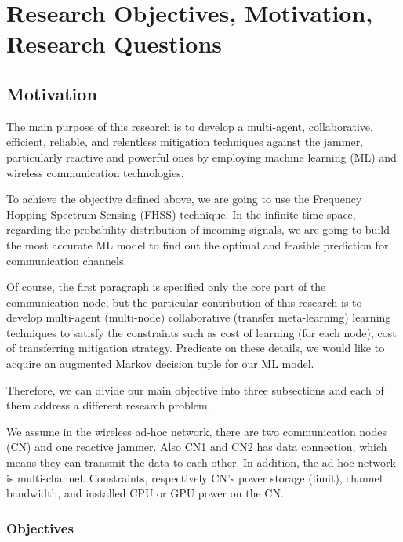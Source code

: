 \documentclass[letterpaper%
, oneside%
, 12pt%
,thesepararticles%
, english%
,creativecommons,hyperref, withAlgo2e%
]{thETS}
\begin{document}


\chapter{Research Objectives, Motivation, Research Questions}

\section{Motivation}

The main purpose of this research is to develop a multi-agent, collaborative, efficient, reliable, and relentless mitigation techniques against the jammer, particularly reactive and powerful ones by employing machine learning (ML) and wireless communication technologies. 

To achieve the objective defined above, we are going to use the Frequency Hopping Spectrum  Sensing (FHSS) technique. In the infinite time space, regarding the probability distribution of incoming signals, we are going to build the most accurate ML model to find out  the optimal and feasible prediction for communication channels.

Of course, the first paragraph is specified only the core part of the communication node, but the particular contribution of this research is to develop multi-agent (multi-node) collaborative (transfer meta-learning) learning techniques to satisfy the constraints such as cost of learning (for each node), cost of transferring mitigation strategy. Predicate on these details, we would like to acquire an augmented Markov decision tuple for our ML model.

Therefore, we can divide our main objective into three subsections and each of them address a different research problem.

We assume in the wireless ad-hoc network, there are two communication nodes (CN) and one reactive jammer. Also CN1 and CN2 has data connection, which means they can transmit the data to each other. In addition, the ad-hoc network is multi-channel. Constraints, respectively CN's power storage (limit), channel bandwidth, and installed CPU or GPU power on the CN. 

\subsection{Objectives}
\end{document}
